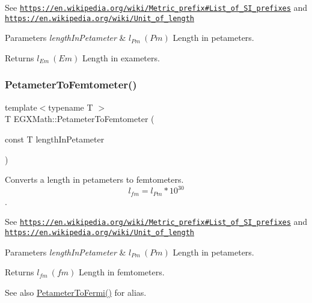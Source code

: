 See \href{https://en.wikipedia.org/wiki/Metric_prefix#List_of_SI_prefixes}{\tt https\+://en.\+wikipedia.\+org/wiki/\+Metric\+\_\+prefix\#\+List\+\_\+of\+\_\+\+S\+I\+\_\+prefixes} and \href{https://en.wikipedia.org/wiki/Unit_of_length}{\tt https\+://en.\+wikipedia.\+org/wiki/\+Unit\+\_\+of\+\_\+length} 
\begin{DoxyParams}{Parameters}
{\em length\+In\+Petameter} & $ l_{Pm}\ (Pm)$ Length in petameters. \\
\hline
\end{DoxyParams}
\begin{DoxyReturn}{Returns}
$ l_{Em}\ (Em)$ Length in exameters. 
\end{DoxyReturn}
\mbox{\label{group___e_g_x_math-_conversions-_length_conversions-_petameter-_s_i_ga295c384b3674727367d592d2b721fcd2}} 
\subsubsection{\texorpdfstring{Petameter\+To\+Femtometer()}{PetameterToFemtometer()}}
{\footnotesize\ttfamily template$<$typename T $>$ \\
T E\+G\+X\+Math\+::\+Petameter\+To\+Femtometer (\begin{DoxyParamCaption}\item[{const T}]{length\+In\+Petameter }\end{DoxyParamCaption})}



Converts a length in petameters to femtometers. \[ l_{fm}=l_{Pm} * 10^{30} \]. 

See \href{https://en.wikipedia.org/wiki/Metric_prefix#List_of_SI_prefixes}{\tt https\+://en.\+wikipedia.\+org/wiki/\+Metric\+\_\+prefix\#\+List\+\_\+of\+\_\+\+S\+I\+\_\+prefixes} and \href{https://en.wikipedia.org/wiki/Unit_of_length}{\tt https\+://en.\+wikipedia.\+org/wiki/\+Unit\+\_\+of\+\_\+length} 
\begin{DoxyParams}{Parameters}
{\em length\+In\+Petameter} & $ l_{Pm}\ (Pm)$ Length in petameters. \\
\hline
\end{DoxyParams}
\begin{DoxyReturn}{Returns}
$ l_{fm}\ (fm)$ Length in femtometers. 
\end{DoxyReturn}
\begin{DoxySeeAlso}{See also}
\mbox{\hyperlink{group___e_g_x_math-_conversions-_length_conversions-_petameter-_non-_s_i_gaba0fd76c76316722eb49006d032fa493}{Petameter\+To\+Fermi()}} for alias. 
\end{DoxySeeAlso}
\mbox{\label{group___e_g_x_math-_conversions-_length_conversions-_petameter-_s_i_ga421403e7220de552c73ae8e3e1edefd1}} 
